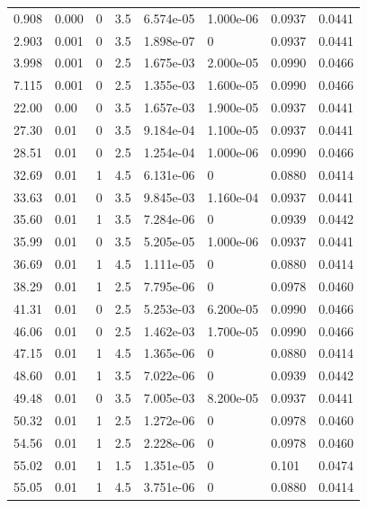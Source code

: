 \documentclass[preview]{standalone}
\begin{document}
{{\begin{tabular}{L{1.2cm}C{1.2cm} C{0.3cm}C{0.5cm} C{1.4cm}C{1.4cm} C{1.4cm}C{1.4cm}}
  0.908  &  0.000  & 0     & 3.5 &  6.574e-05  & 1.000e-06  & 0.0937 &  0.0441   \\ 
  2.903  &  0.001  & 0     & 3.5 &  1.898e-07  & 0  & 0.0937 &  0.0441   \\ 
  3.998  &  0.001  & 0     & 2.5 &  1.675e-03  & 2.000e-05  & 0.0990 &  0.0466   \\ 
  7.115  &  0.001  & 0     & 2.5 &  1.355e-03  & 1.600e-05  & 0.0990 &  0.0466   \\ 
  22.00  &  0.00  & 0     & 3.5 &  1.657e-03  & 1.900e-05  & 0.0937 &  0.0441   \\ 
  27.30  &  0.01  & 0     & 3.5 &  9.184e-04  & 1.100e-05  & 0.0937 &  0.0441   \\ 
  28.51  &  0.01  & 0     & 2.5 &  1.254e-04  & 1.000e-06  & 0.0990 &  0.0466   \\ 
  32.69  &  0.01  & 1     & 4.5 &  6.131e-06  & 0  & 0.0880 &  0.0414   \\ 
  33.63  &  0.01  & 0     & 3.5 &  9.845e-03  & 1.160e-04  & 0.0937 &  0.0441   \\ 
  35.60  &  0.01  & 1     & 3.5 &  7.284e-06  & 0  & 0.0939 &  0.0442   \\ 
  35.99  &  0.01  & 0     & 3.5 &  5.205e-05  & 1.000e-06  & 0.0937 &  0.0441   \\ 
  36.69  &  0.01  & 1     & 4.5 &  1.111e-05  & 0  & 0.0880 &  0.0414   \\ 
  38.29  &  0.01  & 1     & 2.5 &  7.795e-06  & 0  & 0.0978 &  0.0460   \\ 
  41.31  &  0.01  & 0     & 2.5 &  5.253e-03  & 6.200e-05  & 0.0990 &  0.0466   \\ 
  46.06  &  0.01  & 0     & 2.5 &  1.462e-03  & 1.700e-05  & 0.0990 &  0.0466   \\ 
  47.15  &  0.01  & 1     & 4.5 &  1.365e-06  & 0  & 0.0880 &  0.0414   \\ 
  48.60  &  0.01  & 1     & 3.5 &  7.022e-06  & 0  & 0.0939 &  0.0442   \\ 
  49.48  &  0.01  & 0     & 3.5 &  7.005e-03  & 8.200e-05  & 0.0937 &  0.0441   \\ 
  50.32  &  0.01  & 1     & 2.5 &  1.272e-06  & 0  & 0.0978 &  0.0460   \\ 
  54.56  &  0.01  & 1     & 2.5 &  2.228e-06  & 0  & 0.0978 &  0.0460   \\ 
  55.02  &  0.01  & 1     & 1.5 &  1.351e-05  & 0  & 0.101 &  0.0474   \\ 
  55.05  &  0.01  & 1     & 4.5 &  3.751e-06  & 0  & 0.0880 &  0.0414   \\ 

\end{tabular}}}
\end{document}
